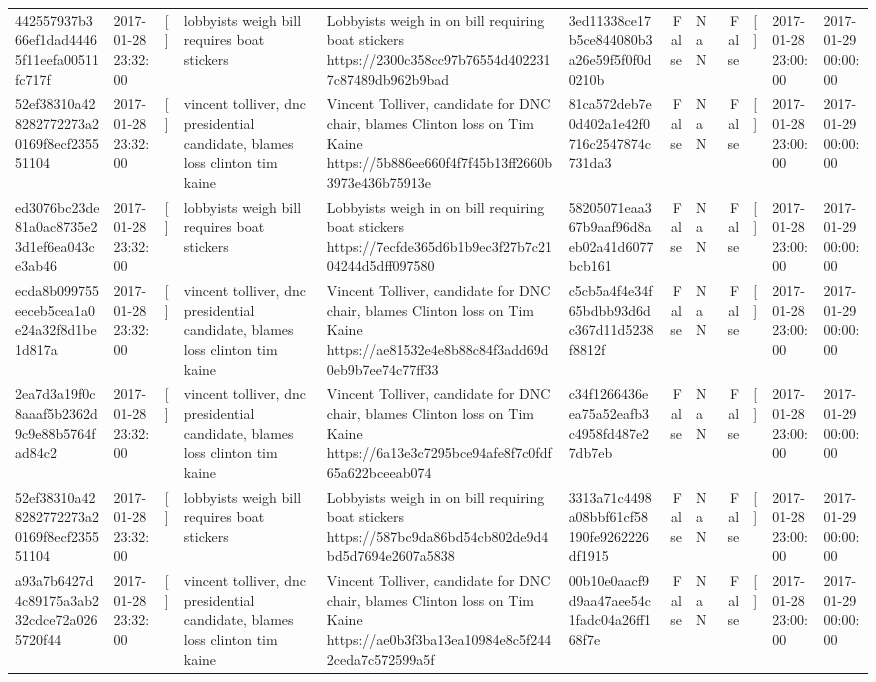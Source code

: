 \begin{tabular}{llllllrlrlll}
442557937b366ef1dad44465f11eefa00511fc717f & 2017-01-28 23:32:00 & [] & lobbyists weigh bill requires boat stickers & Lobbyists weigh in on bill requiring boat stickers https://2300c358cc97b76554d4022317c87489db962b9bad & 3ed11338ce17b5ce844080b3a26e59f5f0f0d0210b & False & NaN & False & [] & 2017-01-28 23:00:00 & 2017-01-29 00:00:00 \\
52ef38310a428282772273a20169f8ecf235551104 & 2017-01-28 23:32:00 & [] & vincent tolliver, dnc presidential candidate, blames loss clinton tim kaine & Vincent Tolliver, candidate for DNC chair, blames Clinton loss on Tim Kaine https://5b886ee660f4f7f45b13ff2660b3973e436b75913e & 81ca572deb7e0d402a1e42f0716c2547874c731da3 & False & NaN & False & [] & 2017-01-28 23:00:00 & 2017-01-29 00:00:00 \\
ed3076bc23de81a0ac8735e23d1ef6ea043ce3ab46 & 2017-01-28 23:32:00 & [] & lobbyists weigh bill requires boat stickers & Lobbyists weigh in on bill requiring boat stickers https://7ecfde365d6b1b9ec3f27b7c2104244d5dff097580 & 58205071eaa367b9aaf96d8aeb02a41d6077bcb161 & False & NaN & False & [] & 2017-01-28 23:00:00 & 2017-01-29 00:00:00 \\
ecda8b099755eeceb5cea1a0e24a32f8d1be1d817a & 2017-01-28 23:32:00 & [] & vincent tolliver, dnc presidential candidate, blames loss clinton tim kaine & Vincent Tolliver, candidate for DNC chair, blames Clinton loss on Tim Kaine https://ae81532e4e8b88c84f3add69d0eb9b7ee74c77ff33 & c5cb5a4f4e34f65bdbb93d6dc367d11d5238f8812f & False & NaN & False & [] & 2017-01-28 23:00:00 & 2017-01-29 00:00:00 \\
2ea7d3a19f0c8aaaf5b2362d9c9e88b5764fad84c2 & 2017-01-28 23:32:00 & [] & vincent tolliver, dnc presidential candidate, blames loss clinton tim kaine & Vincent Tolliver, candidate for DNC chair, blames Clinton loss on Tim Kaine https://6a13e3c7295bce94afe8f7c0fdf65a622bceeab074 & c34f1266436eea75a52eafb3c4958fd487e27db7eb & False & NaN & False & [] & 2017-01-28 23:00:00 & 2017-01-29 00:00:00 \\
52ef38310a428282772273a20169f8ecf235551104 & 2017-01-28 23:32:00 & [] & lobbyists weigh bill requires boat stickers & Lobbyists weigh in on bill requiring boat stickers https://587bc9da86bd54cb802de9d4bd5d7694e2607a5838 & 3313a71c4498a08bbf61cf58190fe9262226df1915 & False & NaN & False & [] & 2017-01-28 23:00:00 & 2017-01-29 00:00:00 \\
a93a7b6427d4c89175a3ab232cdce72a0265720f44 & 2017-01-28 23:32:00 & [] & vincent tolliver, dnc presidential candidate, blames loss clinton tim kaine & Vincent Tolliver, candidate for DNC chair, blames Clinton loss on Tim Kaine https://ae0b3f3ba13ea10984e8c5f2442ceda7c572599a5f & 00b10e0aacf9d9aa47aee54c1fadc04a26ff168f7e & False & NaN & False & [] & 2017-01-28 23:00:00 & 2017-01-29 00:00:00 \\

\end{tabular}
